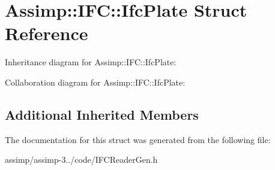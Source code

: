 \hypertarget{struct_assimp_1_1_i_f_c_1_1_ifc_plate}{\section{Assimp\+:\+:I\+F\+C\+:\+:Ifc\+Plate Struct Reference}
\label{struct_assimp_1_1_i_f_c_1_1_ifc_plate}
}


Inheritance diagram for Assimp\+:\+:I\+F\+C\+:\+:Ifc\+Plate\+:


Collaboration diagram for Assimp\+:\+:I\+F\+C\+:\+:Ifc\+Plate\+:
\subsection*{Additional Inherited Members}


The documentation for this struct was generated from the following file\+:\begin{DoxyCompactItemize}
\item 
assimp/assimp-\/3../code/I\+F\+C\+Reader\+Gen.\+h\end{DoxyCompactItemize}
